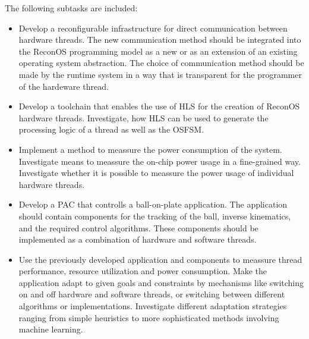 The following subtasks are included:
\begin{itemize}
\item Develop a reconfigurable infrastructure for direct communication
between hardware threads. The new communication method should be integrated
into the ReconOS programming model as a new or as an extension of an existing
operating system abstraction. The choice of communication method should be
made by the runtime system in a way that is transparent for the programmer of
the hardeware thread.
\item Develop a toolchain that enables the use of \ac{HLS} for the creation of
ReconOS hardware threads. Investigate, how \ac{HLS} can be used to generate
the processing logic of a thread as well as the \ac{OSFSM}.
\item Implement a method to meassure the power consumption of the system.
Investigate means to meassure the on-chip power usage in a fine-grained way.
Investigate whether it is possible to meassure the power usage of individual
hardware threads.
\item Develop a \ac{PAC} that controlls a ball-on-plate application. The
application should contain components for the tracking of the ball, inverse
kinematics, and the required control algorithms. These components should be
implemented as a combination of hardware and software threads.
\item Use the previously developed application and components to meassure
thread performance, resource utilization and power consumption. Make the
application adapt to given goals and constraints by mechanisms like switching
on and off hardware and software threads, or switching between different
algorithms or implementations. Investigate different adaptation strategies
ranging from simple heuristics to more sophisticated methods involving machine
learning.
\end{itemize}